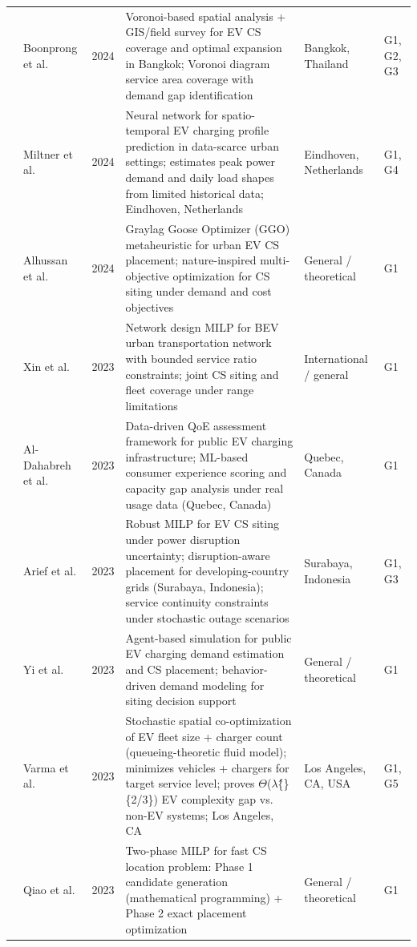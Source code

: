 \documentclass[letterpaper, 12pt, oneside, doublespacing]{Thesis}
\begin{document}
\begin{longtable}{L{0.9cm} L{2.2cm} L{0.8cm} L{3.3cm} L{2.5cm} L{1.5cm}}
\cite{towards_sustainable_2024} & Boonprong et al. & 2024 & Voronoi-based spatial analysis + GIS/field survey for EV CS coverage and optimal expansion in Bangkok; Voronoi diagram service area coverage with demand gap identification & Bangkok, Thailand & G1, G2, G3 \\
\cite{towards_using_2024} & Miltner et al. & 2024 & Neural network for spatio-temporal EV charging profile prediction in data-scarce urban settings; estimates peak power demand and daily load shapes from limited historical data; Eindhoven, Netherlands & Eindhoven, Netherlands & G1, G4 \\
\cite{urban_electric_2024} & Alhussan et al. & 2024 & Graylag Goose Optimizer (GGO) metaheuristic for urban EV CS placement; nature-inspired multi-objective optimization for CS siting under demand and cost objectives & General {\slash} theoretical & G1 \\
\cite{a_battery_2023} & Xin et al. & 2023 & Network design MILP for BEV urban transportation network with bounded service ratio constraints; joint CS siting and fleet coverage under range limitations & International {\slash} general & G1 \\
\cite{a_data-driven_2023} & Al-Dahabreh et al. & 2023 & Data-driven QoE assessment framework for public EV charging infrastructure; ML-based consumer experience scoring and capacity gap analysis under real usage data (Quebec, Canada) & Quebec, Canada & G1 \\
\cite{a_robust_2023} & Arief et al. & 2023 & Robust MILP for EV CS siting under power disruption uncertainty; disruption-aware placement for developing-country grids (Surabaya, Indonesia); service continuity constraints under stochastic outage scenarios & Surabaya, Indonesia & G1, G3 \\
\cite{an_agent-based_2023} & Yi et al. & 2023 & Agent-based simulation for public EV charging demand estimation and CS placement; behavior-driven demand modeling for siting decision support & General {\slash} theoretical & G1 \\
\cite{electric_vehicle_2023} & Varma et al. & 2023 & Stochastic spatial co-optimization of EV fleet size + charger count (queueing-theoretic fluid model); minimizes vehicles + chargers for target service level; proves $\Theta$($\lambda$\^\{\}\{2/3\}) EV complexity gap vs. non-EV systems; Los Angeles, CA & Los Angeles, CA, USA & G1, G5 \\
\cite{fast-charging_station_2023} & Qiao et al. & 2023 & Two-phase MILP for fast CS location problem: Phase 1 candidate generation (mathematical programming) + Phase 2 exact placement optimization & General {\slash} theoretical & G1 \\

\end{longtable}
\end{document}

